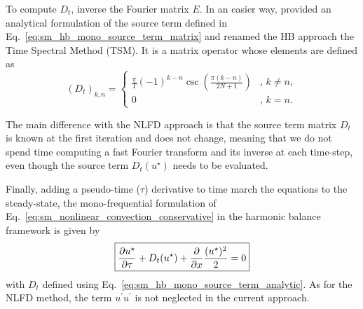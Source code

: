 To compute $D_t$, \citet{Hall2002}
inverse the Fourier matrix $E$.
In an easier way, \citet{Gopinath2005} provided 
an analytical formulation of the source term defined 
in Eq.~\eqref{eq:sm_hb_mono_source_term_matrix} and 
renamed the HB approach the Time Spectral Method (TSM).
It is a matrix operator whose elements are defined as
\begin{equation}
  (D_t)_{k, n} =
  \begin{cases}
    \frac{\pi}{T}(-1)^{k-n}\csc\left(\frac{\pi
        (k-n)}{2N+1}\right) &, \, k\neq n,\\
    0 &, \, k=n.
  \end{cases}
  \label{eq:sm_hb_mono_source_term_analytic}
\end{equation}

The main difference with the NLFD approach
is that the source term matrix $D_t$ is known at the first iteration and does
not change, meaning that we do not spend time computing a
fast Fourier transform and its inverse at each time-step,
even though the source term $D_t(u^\star)$ needs to be evaluated.


Finally, adding a pseudo-time ($\tau$) derivative to 
time march the equations to the steady-state, 
the mono-frequential formulation of 
Eq.~\eqref{eq:sm_nonlinear_convection_conservative} in the harmonic
balance framework is given by
\begin{equation}
	\fbox{$
	\displaystyle \frac{\partial u^\star}{\partial \tau} + 
	D_t (u^\star) + 
	\displaystyle \frac{\partial}{\partial x}
		\frac{(u^\star)^2}{2} = 0
	$}
\end{equation}
with $D_t$ defined using Eq.~\eqref{eq:sm_hb_mono_source_term_analytic}.
As for the NLFD method, the term $u^\prime u^\prime$
is not neglected in the current approach.

